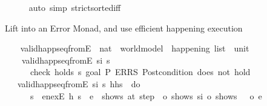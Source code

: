 \begin{isabellebody}
\ \ \ \ \isamarkupfalse%
\ {\isacharparenleft}{\kern0pt}auto\ simp{\isacharcolon}{\kern0pt}\ strict{\isacharunderscore}{\kern0pt}sorted{\isacharunderscore}{\kern0pt}iff{\isacharparenright}{\kern0pt}%
\endisatagproof
{\isafoldproof}%
%
\isadelimproof
%
\endisadelimproof
%
\begin{isamarkuptext}%
Lift  into an Error Monad, and use efficient 
  happening execution %
\end{isamarkuptext}\isamarkuptrue%
\ \ \isamarkupfalse%
\ valid{\isacharunderscore}{\kern0pt}happ{\isacharunderscore}{\kern0pt}seq{\isacharunderscore}{\kern0pt}fromE\ {\isacharcolon}{\kern0pt}{\isacharcolon}{\kern0pt}\ {\isachardoublequoteopen}nat\ {\isasymRightarrow}\ world{\isacharunderscore}{\kern0pt}model\ {\isasymRightarrow}\ happening\ list\ {\isasymRightarrow}\ {\isacharunderscore}{\kern0pt}{\isacharplus}{\kern0pt}unit{\isachardoublequoteclose}\ \isanewline
\ \ \ \ {\isachardoublequoteopen}valid{\isacharunderscore}{\kern0pt}happ{\isacharunderscore}{\kern0pt}seq{\isacharunderscore}{\kern0pt}fromE\ si\ s\ {\isacharbrackleft}{\kern0pt}{\isacharbrackright}{\kern0pt}\ {\isacharequal}{\kern0pt}\ \isanewline
\ \ \ \ \ \ check\ {\isacharparenleft}{\kern0pt}holds\ s\ {\isacharparenleft}{\kern0pt}goal\ P{\isacharparenright}{\kern0pt}{\isacharparenright}{\kern0pt}\ {\isacharparenleft}{\kern0pt}ERRS\ {\isacharprime}{\kern0pt}{\isacharprime}{\kern0pt}Postcondition\ does\ not\ hold{\isacharprime}{\kern0pt}{\isacharprime}{\kern0pt}{\isacharparenright}{\kern0pt}{\isachardoublequoteclose}\isanewline
\ \ {\isacharbar}{\kern0pt}\ {\isachardoublequoteopen}valid{\isacharunderscore}{\kern0pt}happ{\isacharunderscore}{\kern0pt}seq{\isacharunderscore}{\kern0pt}fromE\ si\ s\ {\isacharparenleft}{\kern0pt}h{\isacharhash}{\kern0pt}hs{\isacharparenright}{\kern0pt}\ {\isacharequal}{\kern0pt}\ do\ {\isacharbraceleft}{\kern0pt}\isanewline
\ \ \ \ \ \ s\ {\isasymleftarrow}\ en{\isacharunderscore}{\kern0pt}exE\ h\ s\ {\isacharless}{\kern0pt}{\isacharplus}{\kern0pt}{\isacharquery}{\kern0pt}\ {\isacharparenleft}{\kern0pt}{\isasymlambda}e\ {\isacharunderscore}{\kern0pt}{\isachardot}{\kern0pt}\ shows\ {\isacharprime}{\kern0pt}{\isacharprime}{\kern0pt}at\ step\ {\isacharprime}{\kern0pt}{\isacharprime}{\kern0pt}\ o\ shows\ si\ o\ shows\ {\isacharprime}{\kern0pt}{\isacharprime}{\kern0pt}{\isacharcolon}{\kern0pt}\ {\isacharprime}{\kern0pt}{\isacharprime}{\kern0pt}\ o\ e\ {\isacharparenleft}{\kern0pt}{\isacharparenright}{\kern0pt}{\isacharparenright}{\kern0pt}{\isacharsemicolon}{\kern0pt}\isanewline

\end{isabellebody}
